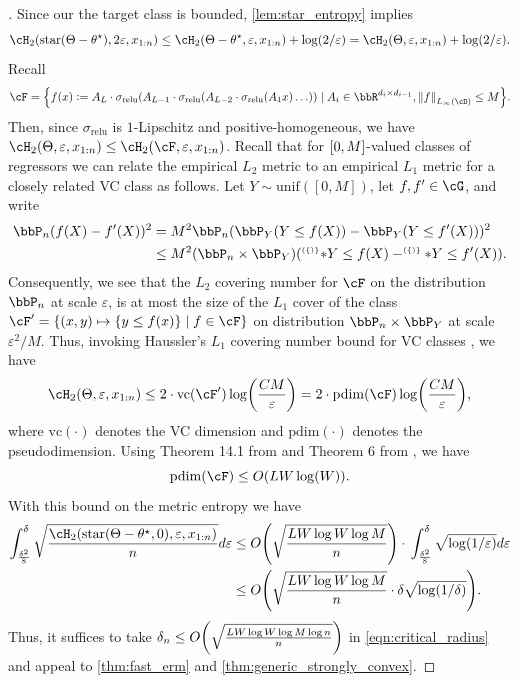 \documentclass[11pt]{article} %
\newcommand{\pref}[1]{\cref{#1}}
\theoremstyle{theorem}  %
\theoremstyle{plain}
\DeclarePairedDelimiter{\brk}{[}{]}
\DeclarePairedDelimiter{\crl}{\{}{\}}
\DeclarePairedDelimiter{\prn}{(}{)}
\DeclarePairedDelimiter{\nrm}{\|}{\|}
\newcommand{\veps}{\varepsilon}
\newcommand{\ldef}{\vcentcolon=}
\newcommand{\xr}[1][n]{x_{1:#1}}
\newcommand{\starhull}{\mathrm{star}}
\newcommand{\target}{\Theta}
\newcommand{\besttwo}{\theta^{\star}}
\newcommand{\ind}[1]{^{\scriptscriptstyle (#1)}}
\begin{document}
\begin{proof}[\text{Proof for \pref{ex:nn_fast}}]
Since our the target class is bounded, \pref{lem:star_entropy} implies
\[
\cH_2(\starhull(\target-\besttwo),2\veps,\xr[n])
\leq{} \cH_2(\target-\besttwo,\veps,\xr[n]) + \log(2/\veps)
= \cH_2(\target,\veps,\xr[n]) + \log(2/\veps).
\]
Recall
\[
\cF = \crl*{
f(x)\ldef{}A_{L}\cdot\sigma_{\mathrm{relu}}(A_{L-1}\cdot\sigma_{\mathrm{relu}}(A_{L-2}\cdot\sigma_{\mathrm{relu}}(A_{1}x)\ldots))
\mid{} A_{i}\in\bbR^{d_{i}\times{}d_{i-1}},\nrm*{f}_{L_{\infty}(\cD)}\leq{}M
}.
\]
Then, since $\sigma_{\mathrm{relu}}$ is $1$-Lipschitz and positive-homogeneous, we have $\cH_2(\target,\veps,\xr[n])\leq{}\cH_2(\cF,\veps,\xr[n])$. Recall that for $\brk*{0,M}$-valued classes of regressors we can relate the empirical $L_{2}$ metric to an empirical $L_{1}$ metric for a closely related VC class as follows. Let $Y\sim{}\mathrm{unif}([0,M])$, let $f,f'\in\cG$, and write
\begin{align*}
\bbP_{n}(f(X)-f'(X))^{2} &= M^{2}\bbP_{n}(\bbP_{Y}(Y\leq{}f(X))-\bbP_{Y}(Y\leq{}f'(X)))^{2}\\
&\leq{} M^{2}(\bbP_{n}\times{}\bbP_{Y})(\ind\crl*{Y\leq{}f(X)}-\ind\crl*{Y\leq{}f'(X)}).
\end{align*}
Consequently, we see that the $L_{2}$ covering number for $\cF$ on the distribution $\bbP_{n}$ at scale $\veps$, is at most the size of the $L_{1}$ cover of the class $\cF'= \crl*{(x,y)\mapsto{}\crl*{y\leq{}f(x)}\mid{}f\in\cF}$ on distribution $\bbP_n\times{}\bbP_{Y}$ at scale $\veps^{2}/M$. Thus, invoking Haussler's $L_{1}$ covering number bound for VC classes \citep{haussler1995sphere}, we have
\begin{align*}
\cH_2(\target,\veps,\xr[n]) \leq{} 2\cdot\mathrm{vc}(\cF')\log\prn*{\frac{CM}{\veps}} =  2\cdot{}\mathrm{pdim}(\cF)\log\prn*{\frac{CM}{\veps}},
\end{align*}
where $\mathrm{vc}(\cdot)$ denotes the VC dimension and $\mathrm{pdim}(\cdot)$ denotes the pseudodimension. Using Theorem 14.1 from \cite{anthony1999neural} and Theorem 6 from \cite{bartlett2017nearly}, we have
\[
\mathrm{pdim}(\cF)\leq{}O(LW\log(W)).
\]
With this bound on the metric entropy we have
\begin{align*}
\int_{\frac{\delta^{2}}{8}}^{\delta} \sqrt{\frac{\cH_2(\starhull(\target-\besttwo,0),\veps,\xr[n])}{n}} d\veps &\leq{} 
O\prn*{
\sqrt{\frac{LW\log{}W\log{}M}{n}}
}\cdot{}
\int_{\frac{\delta^{2}}{8}}^{\delta}\sqrt{\log(1/\veps)}d\veps \\
&\leq{}
O\prn*{\sqrt{\frac{LW\log{}W\log{}M}{n}}\cdot\delta\sqrt{\log(1/\delta)}}.
\end{align*}
Thus, it suffices to take $\delta_{n}\leq{}O\prn*{
\sqrt{\frac{LW\log{}W\log{}M\log{}n}{n}}
}$ in \pref{eqn:critical_radius} and appeal to \pref{thm:fast_erm} and \pref{thm:generic_strongly_convex}.
\end{proof}
\end{document}
